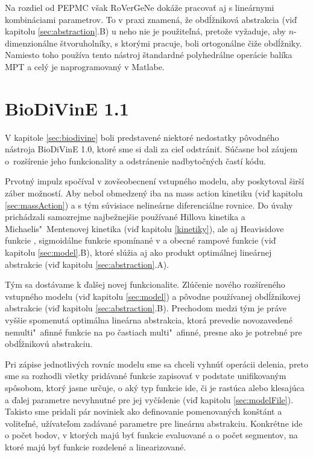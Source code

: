 \documentclass[11pt,final,oneside]{fithesis}
\begin{document}
Na rozdiel od PEPMC v\v sak RoVerGeNe dok\'a\v ze pracova\v t aj s line\'arnymi kombin\'aciami parametrov. To v praxi znamen\'a, \v ze obd\'l\v znikov\'a
abstrakcia (vi\v d kapitolu \ref{sec:abstraction}.B) u neho nie je
pou\v zite\v ln\'a, preto\v ze vy\v zaduje, aby $n$-dimen\-zion\'alne \v stvoruholn\'iky, s ktor\'ymi pracuje, boli ortogon\'alne \v ci\v ze obd\'l\v zniky.
Namiesto toho pou\v z\'iva tento n\'astroj \v standardn\'e polyhedr\'alne oper\'acie bal\'ika MPT \cite{mpt} a cel\'y je naprogramovan\'y v Matlabe.
\cite{rovergene}
\cite{rovergene-site}

\chapter{BioDiVinE 1.1}
V kapitole \ref{sec:biodivine} boli predstaven\'e niektor\'e nedostatky p\^ ovodn\'eho n\'astroja BioDiVinE 1.0, ktor\'e sme si dali za cie\v l odstr\'ani\v t.
S\'u\v casne bol z\'aujem o~roz\v s\'irenie jeho funkcionality a odstr\'anenie nadbyto\v cn\'ych \v cast\'i k\'odu. 

Prvotn\'y impulz spo\v c\'ival v zov\v seobecnen\'i vstupn\'eho modelu, aby poskytoval \v sir\v s\'i z\'aber mo\v znost\'i. Aby nebol obmedzen\'y iba na mass 
action kinetiku (vi\v d kapitolu \ref{sec:massAction}) a s t\'ym s\'uvisiace neline\'arne diferenci\'alne rovnice. Do \'uvahy prich\'adzali samozrejme 
najbe\v znej\v sie pou\v z\'ivan\'e Hillova kinetika a Michaelis"~Mente\-novej kinetika (vi\v d kapitolu \ref{kinetiky}), ale aj Heavisidove funkcie 
\cite{step}, sigmoid\'alne funkcie spom\'inan\'e v \cite{CAV-2011} a obecn\'e rampov\'e funkcie (vi\v d kapitolu \ref{sec:model}.B), ktor\'e 
sl\'u\v zia aj ako produkt optim\'alnej line\'arnej abstrakcie (vi\v d kapitolu \ref{sec:abstraction}.A).

T\'ym sa dost\'avame k \v dal\v sej novej funkcionalite. Zl\'u\v cenie nov\'eho roz\v s\'iren\'eho vstupn\'eho modelu (vi\v d kapitolu \ref{sec:model}) a p\^ ovodne 
pou\v z\'ivanej obd\'l\v znikovej abstrakcie (vi\v d kapitolu \ref{sec:abstraction}.B). Prechodom medzi t\'ym je pr\'ave vy\v s\v sie spomenut\'a op\-ti\-m\'al\-na 
line\'arna abstrakcia, ktor\'a prevedie novozaveden\'e nemulti"~afin\-n\'e funk\-cie na po \v castiach multi"~afinn\'e, presne ako je potrebn\'e pre 
obd\'l\v znikov\'u abstrakciu.

Pri z\'apise jednotliv\'ych rovn\'ic modelu sme sa chceli vyhn\'u\v t oper\'acii delenia, preto sme sa rozhodli v\v setky prid\'avan\'e funkcie zapisova\v t
v podstate unifikovan\'ym sp\^ osobom, ktor\'y jasne ur\v cuje, o ak\'y typ funkcie ide, \v ci je rast\'uca alebo klesaj\'uca a \v dalej parametre 
nevyhnutn\'e pre jej vy\v c\'islenie (vi\v d kapitolu \ref{sec:modelFile}). Takisto sme pridali p\'ar noviniek ako definovanie pomenovan\'ych kon\v st\'ant a volite\v ln\'e, u\v z\'ivate\v lom 
zad\'avan\'e parametre pre line\'arnu abstrakciu. Konkr\'etne ide o po\v cet bodov, v ktor\'ych maj\'u by\v t funkcie evaluovan\'e a o po\v cet segmentov, 
na ktor\'e maj\'u by\v t funkcie rozdelen\'e a linearizovan\'e.
\end{document}
